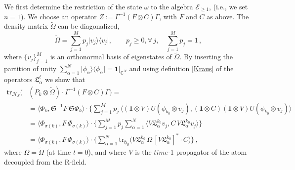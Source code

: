 \documentclass[12pt]{article}
\begin{document}
 We first determine the restriction of the state $\omega$ to the algebra $\mathcal{E}_{\geq 1}$, (i.e., we set $n=1$). We choose an operator
 $Z:=\Gamma^{-1} (F\otimes C)\Gamma$, with $F$ and $C$ as above. The density matrix $\widetilde{\Omega}$ can be diagonalized,
 $$\widetilde{\Omega}= \sum_{j=1}^{M} p_j \vert v_j\rangle \langle v_j\vert, \qquad p_j \geq 0, \forall\, j, \quad
 \sum_{j=1}^{M}p_j =1\,,$$
 where $\big\{v_j \big\}_{j=1}^{M}$ is an orthonormal basis of eigenstates of $\widetilde{\Omega}$. 
 By inserting the partition of unity $\sum_{\alpha=1}^{N} \vert \phi_{\alpha} \rangle \langle \phi_{\alpha}\vert = \mathbf{1}\vert_{\mathbb{C}^{N}}$ and using definition \eqref{Kraus} of the operators $\mathfrak{L}_{\alpha}^{\ell}$ we show that
 \begin{align}\label{one step}
 \text{tr}_{\mathcal{H}_S}\big(&(P_{{k}}\otimes \widetilde{\Omega})\cdot \Gamma^{-1}(F\otimes C)\Gamma\big) = \nonumber\\
& = \langle \Phi_{{k}}, \mathfrak{S}^{-1} F\, \mathfrak{S} \Phi_{{k}}\rangle \cdot \Big\{\sum_{j=1}^{M} p_{j}\,
\langle (\mathbf{1}\otimes V)U(\phi_{k_0}\otimes v_j), (\mathbf{1}\otimes C) (\mathbf{1}\otimes V) U(\phi_{k_0} \otimes v_j )\rangle\, \nonumber \\
& =\langle \Phi_{\sigma({k})}, F\,  \Phi_{\sigma({k})}\rangle \cdot \Big\{\sum_{j=1}^{M} p_{j} \sum_{\alpha=1}^{N} \langle V\mathfrak{L}_{\alpha}^{k_0} v_j, C\, V\mathfrak{L}_{\alpha}^{k_0} v_j \rangle\Big\} \nonumber \\
& = \langle \Phi_{\sigma({k})}, F\,  \Phi_{\sigma({k})}\rangle \cdot \Big\{\sum_{\alpha=1}^{N} 
\text{tr}_{\mathfrak{h}_S} \big(V\mathfrak{L}_{\alpha}^{k_0}\, \Omega\, [V\mathfrak{L}_{\alpha}^{k_0} ]^{*} \cdot C\big)\Big\}\,,
\end{align}
where $\Omega = \widetilde{\Omega}$ (at time $t=0$), and where $V$ is the $time$-1 propagator of the atom decoupled 
from the R-field.
\end{document}
